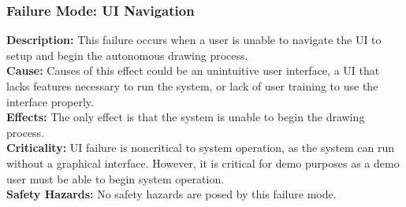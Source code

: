 \subsubsection{Failure Mode: UI Navigation}
\label{sec:ui_fm_navigation}
\textbf{Description:} This failure occurs when a user is unable to navigate the UI to setup and begin the autonomous drawing process. \\
\textbf{Cause:} Causes of this effect could be an unintuitive user interface, a UI that lacks features necessary to run the system, or lack of user training to use the interface properly. \\
\textbf{Effects:} The only effect is that the system is unable to begin the drawing process. \\
\textbf{Criticality:} UI failure is noncritical to system operation, as the system can run without a graphical interface. However, it is critical for demo purposes as a demo user must be able to begin system operation. \\
\textbf{Safety Hazards:} No safety hazards are posed by this failure mode.
